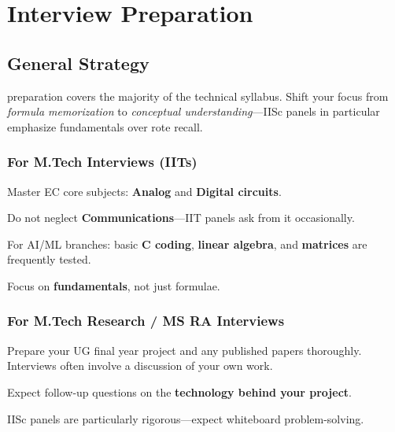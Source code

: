
\chapter{Interview Preparation}
\label{chap:interview-prep}

\section{General Strategy}
\label{sec:interview-strategy}

\begin{protip}
  \GATE preparation covers the majority of the technical syllabus. Shift your
  focus from \emph{formula memorization} to \emph{conceptual understanding}---IISc
  panels in particular emphasize fundamentals over rote recall.
\end{protip}

\subsection{For M.Tech Interviews (IITs)}

\begin{pfChecklist}
  \item Master EC core subjects: \textbf{Analog} and \textbf{Digital circuits}.
  \item Do not neglect \textbf{Communications}---IIT panels ask from it
        occasionally.
  \item For AI/ML branches: basic \textbf{C coding}, \textbf{linear algebra},
        and \textbf{matrices} are frequently tested.
  \item Focus on \textbf{fundamentals}, not just formulae.
\end{pfChecklist}

\subsection{For M.Tech Research / MS RA Interviews}

\begin{pfChecklist}
  \item Prepare your UG final year project and any published papers thoroughly.
        Interviews often involve a discussion of your own work.
  \item Expect follow-up questions on the \textbf{technology behind your project}.
  \item IISc panels are particularly rigorous---expect whiteboard problem-solving.
\end{pfChecklist}

